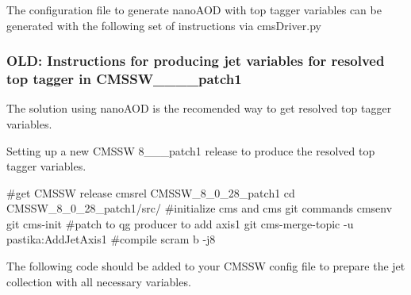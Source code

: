 The configuration file to generate nano\-A\-O\-D with top tagger variables can be generated with the following set of instructions via cms\-Driver.\-py




\subsubsection*{O\-L\-D\-: Instructions for producing jet variables for resolved top tagger in C\-M\-S\-S\-W\-\_\-\_\-\_\-\_\-patch1}

The solution using nano\-A\-O\-D is the recomended way to get resolved top tagger variables.

Setting up a new C\-M\-S\-S\-W 8\-\_\-\_\-\_\-patch1 release to produce the resolved top tagger variables.


\begin{DoxyCode}
\textcolor{preprocessor}{#get CMSSW release}
\textcolor{preprocessor}{}cmsrel CMSSW\_8\_0\_28\_patch1
cd CMSSW\_8\_0\_28\_patch1/src/
\textcolor{preprocessor}{#initialize cms and cms git commands }
\textcolor{preprocessor}{}cmsenv
git cms-init
\textcolor{preprocessor}{#patch to qg producer to add axis1}
\textcolor{preprocessor}{}git cms-merge-topic -u pastika:AddJetAxis1
\textcolor{preprocessor}{#compile}
\textcolor{preprocessor}{scram b -j8}
\end{DoxyCode}


The following code should be added to your C\-M\-S\-S\-W config file to prepare the jet collection with all necessary variables.


